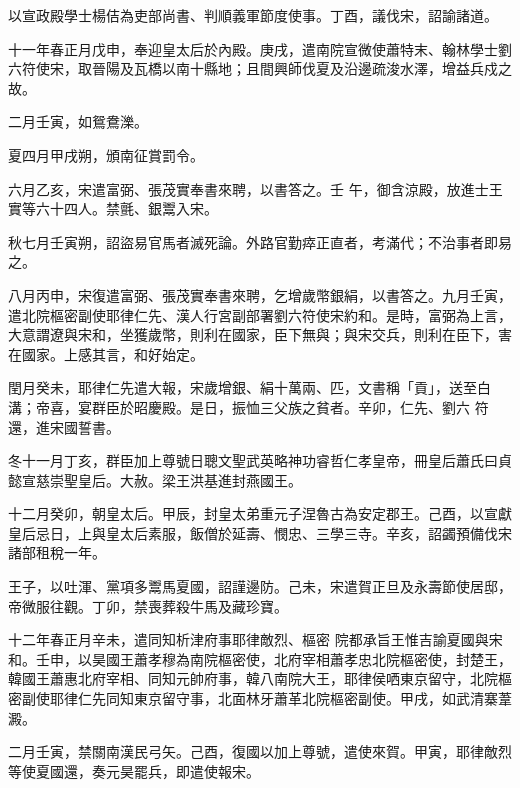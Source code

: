 \begin{pinyinscope}
 以宣政殿學士楊佶為吏部尚書、判順義軍節度使事。丁酉，議伐宋，詔諭諸道。



 十一年春正月戊申，奉迎皇太后於內殿。庚戌，遣南院宣微使蕭特末、翰林學士劉六符使宋，取晉陽及瓦橋以南十縣地；且間興師伐夏及沿邊疏浚水澤，增益兵戍之故。



 二月壬寅，如鴛鴦濼。



 夏四月甲戌朔，頒南征賞罰令。



 六月乙亥，宋遣富弼、張茂實奉書來聘，以書答之。壬
 午，御含涼殿，放進士王實等六十四人。禁氈、銀鬻入宋。



 秋七月壬寅朔，詔盜易官馬者滅死論。外路官勤瘁正直者，考滿代；不治事者即易之。



 八月丙申，宋復遣富弼、張茂實奉書來聘，乞增歲幣銀絹，以書答之。九月壬寅，遣北院樞密副使耶律仁先、漢人行宮副部署劉六符使宋約和。是時，富弼為上言，大意謂遼與宋和，坐獲歲幣，則利在國家，臣下無與；與宋交兵，則利在臣下，害在國家。上感其言，和好始定。



 閏月癸未，耶律仁先遣大報，宋歲增銀、絹十萬兩、匹，文書稱「貢」，送至白溝；帝喜，宴群臣於昭慶殿。是日，振恤三父族之貧者。辛卯，仁先、劉六
 符還，進宋國誓書。



 冬十一月丁亥，群臣加上尊號日聰文聖武英略神功睿哲仁孝皇帝，冊皇后蕭氏曰貞懿宣慈崇聖皇后。大赦。梁王洪基進封燕國王。



 十二月癸卯，朝皇太后。甲辰，封皇太弟重元子涅魯古為安定郡王。己酉，以宣獻皇后忌日，上與皇太后素服，飯僧於延壽、憫忠、三學三寺。辛亥，詔蠲預備伐宋諸部租稅一年。



 王子，以吐渾、黨項多鬻馬夏國，詔謹邊防。己未，宋遣賀正旦及永壽節使居邸，帝微服往觀。丁卯，禁喪葬殺牛馬及藏珍寶。



 十二年春正月辛未，遣同知析津府事耶律敵烈、樞密
 院都承旨王惟吉諭夏國與宋和。壬申，以昊國王蕭孝穆為南院樞密使，北府宰相蕭孝忠北院樞密使，封楚王，韓國王蕭惠北府宰相、同知元帥府事，韓八南院大王，耶律侯哂東京留守，北院樞密副使耶律仁先同知東京留守事，北面林牙蕭革北院樞密副使。甲戌，如武清寨葦澱。



 二月壬寅，禁關南漢民弓矢。己酉，復國以加上尊號，遣使來賀。甲寅，耶律敵烈等使夏國還，奏元昊罷兵，即遣使報宋。




\end{pinyinscope}
